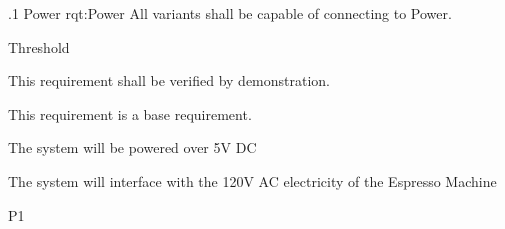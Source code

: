 \ONERQMTVKPP
{\RqtNumberBase.1}
{Power}
{rqt:Power}
{All \ThisSys variants shall be capable of connecting to \TBD Power.}
{
	\item [Phase 1] Threshold
}
{This requirement shall be verified by demonstration.}
{
	\item [N/A] This requirement is a base requirement.
}
{
  \item The system will be powered over 5V DC
  \item The system will interface with the 120V AC electricity of the Espresso Machine
}
{P1}


